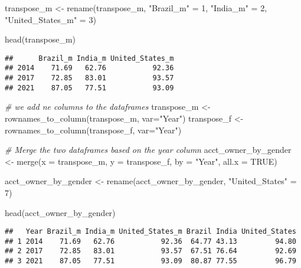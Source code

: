 \documentclass[
]{article}
\newenvironment{Shaded}{\begin{snugshade}}{\end{snugshade}}
\newcommand{\AttributeTok}[1]{\textcolor[rgb]{0.77,0.63,0.00}{#1}}
\newcommand{\CommentTok}[1]{\textcolor[rgb]{0.56,0.35,0.01}{\textit{#1}}}
\newcommand{\ConstantTok}[1]{\textcolor[rgb]{0.00,0.00,0.00}{#1}}
\newcommand{\DecValTok}[1]{\textcolor[rgb]{0.00,0.00,0.81}{#1}}
\newcommand{\FunctionTok}[1]{\textcolor[rgb]{0.00,0.00,0.00}{#1}}
\newcommand{\NormalTok}[1]{#1}
\newcommand{\OtherTok}[1]{\textcolor[rgb]{0.56,0.35,0.01}{#1}}
\newcommand{\StringTok}[1]{\textcolor[rgb]{0.31,0.60,0.02}{#1}}
\begin{document}
\begin{Shaded}
\begin{Highlighting}[]
\NormalTok{transpose\_m }\OtherTok{\textless{}{-}} \FunctionTok{rename}\NormalTok{(transpose\_m, }\StringTok{"Brazil\_m"} \OtherTok{=} \DecValTok{1}\NormalTok{, }\StringTok{"India\_m"} \OtherTok{=} \DecValTok{2}\NormalTok{, }\StringTok{"United\_States\_m"} \OtherTok{=} \DecValTok{3}\NormalTok{)}


\FunctionTok{head}\NormalTok{(transpose\_m)}
\end{Highlighting}
\end{Shaded}

\begin{verbatim}
##      Brazil_m India_m United_States_m
## 2014    71.69   62.76           92.36
## 2017    72.85   83.01           93.57
## 2021    87.05   77.51           93.09
\end{verbatim}

\begin{Shaded}
\begin{Highlighting}[]
\CommentTok{\# we add ne columns to the dataframes}
\NormalTok{transpose\_m }\OtherTok{\textless{}{-}} \FunctionTok{rownames\_to\_column}\NormalTok{(transpose\_m, }\AttributeTok{var=}\StringTok{"Year"}\NormalTok{)}
\NormalTok{transpose\_f }\OtherTok{\textless{}{-}} \FunctionTok{rownames\_to\_column}\NormalTok{(transpose\_f, }\AttributeTok{var=}\StringTok{"Year"}\NormalTok{)}
\end{Highlighting}
\end{Shaded}

\begin{Shaded}
\begin{Highlighting}[]
\CommentTok{\# Merge the two dataframes based on the year column}
\NormalTok{acct\_owner\_by\_gender }\OtherTok{\textless{}{-}} \FunctionTok{merge}\NormalTok{(}\AttributeTok{x =}\NormalTok{ transpose\_m, }\AttributeTok{y =}\NormalTok{ transpose\_f, }\AttributeTok{by =} \StringTok{"Year"}\NormalTok{, }\AttributeTok{all.x =} \ConstantTok{TRUE}\NormalTok{)}

\NormalTok{acct\_owner\_by\_gender }\OtherTok{\textless{}{-}} \FunctionTok{rename}\NormalTok{(acct\_owner\_by\_gender, }\StringTok{"United\_States"} \OtherTok{=} \DecValTok{7}\NormalTok{)}

\FunctionTok{head}\NormalTok{(acct\_owner\_by\_gender)}
\end{Highlighting}
\end{Shaded}

\begin{verbatim}
##   Year Brazil_m India_m United_States_m Brazil India United_States
## 1 2014    71.69   62.76           92.36  64.77 43.13         94.80
## 2 2017    72.85   83.01           93.57  67.51 76.64         92.69
## 3 2021    87.05   77.51           93.09  80.87 77.55         96.79
\end{verbatim}
\end{document}
